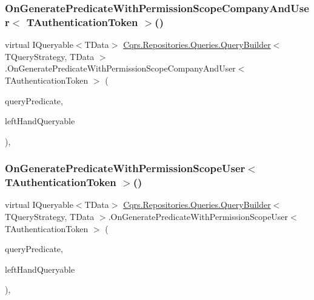 \subsubsection{\texorpdfstring{On\+Generate\+Predicate\+With\+Permission\+Scope\+Company\+And\+User$<$ T\+Authentication\+Token $>$()}{OnGeneratePredicateWithPermissionScopeCompanyAndUser< TAuthenticationToken >()}}
{\footnotesize\ttfamily virtual I\+Queryable$<$T\+Data$>$ \hyperlink{classCqrs_1_1Repositories_1_1Queries_1_1QueryBuilder}{Cqrs.\+Repositories.\+Queries.\+Query\+Builder}$<$ T\+Query\+Strategy, T\+Data $>$.On\+Generate\+Predicate\+With\+Permission\+Scope\+Company\+And\+User$<$ T\+Authentication\+Token $>$ (\begin{DoxyParamCaption}\item[{\hyperlink{classCqrs_1_1Repositories_1_1Queries_1_1QueryPredicate}{Query\+Predicate}}]{query\+Predicate,  }\item[{I\+Queryable$<$ T\+Data $>$}]{left\+Hand\+Queryable }\end{DoxyParamCaption})\hspace{0.3cm}{\ttfamily [protected]}, {\ttfamily [virtual]}}

\mbox{\label{classCqrs_1_1Repositories_1_1Queries_1_1QueryBuilder_a314592206fd5d2a25866227cc547dd6b}} 
\subsubsection{\texorpdfstring{On\+Generate\+Predicate\+With\+Permission\+Scope\+User$<$ T\+Authentication\+Token $>$()}{OnGeneratePredicateWithPermissionScopeUser< TAuthenticationToken >()}}
{\footnotesize\ttfamily virtual I\+Queryable$<$T\+Data$>$ \hyperlink{classCqrs_1_1Repositories_1_1Queries_1_1QueryBuilder}{Cqrs.\+Repositories.\+Queries.\+Query\+Builder}$<$ T\+Query\+Strategy, T\+Data $>$.On\+Generate\+Predicate\+With\+Permission\+Scope\+User$<$ T\+Authentication\+Token $>$ (\begin{DoxyParamCaption}\item[{\hyperlink{classCqrs_1_1Repositories_1_1Queries_1_1QueryPredicate}{Query\+Predicate}}]{query\+Predicate,  }\item[{I\+Queryable$<$ T\+Data $>$}]{left\+Hand\+Queryable }\end{DoxyParamCaption})\hspace{0.3cm}{\ttfamily [protected]}, {\ttfamily [virtual]}}



